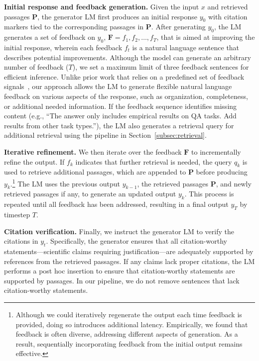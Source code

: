 \documentclass{article} %
\renewcommand{\paragraph}[1]{\noindent \textbf{#1}}
\begin{document}
\paragraph{Initial response and feedback generation.}
Given the input $x$ and retrieved passages $\mathbf{P}$, the generator LM first produces an initial response $y_0$  with citation markers tied to the corresponding passages in $\mathbf{P}$.
After generating $y_0$, the LM generates a set of feedback on $y_0$, $\mathbf{F} = {f_1, f_2, \ldots, f_T}$, that is aimed at improving the initial response, wherein each feedback $f_t$ is a natural language sentence that describes potential improvements. 
Although the model can generate an arbitrary number of feedback ($T$), we set a maximum limit of three feedback sentences for efficient inference. 
Unlike prior work that relies on a predefined set of feedback signals~\citep{asai2024selfrag}, our approach allows the LM to generate flexible natural language feedback on various aspects of the response, such as organization, completeness, or additional needed information. If the feedback sequence identifies missing content (e.g., ``The answer only includes empirical results on QA tasks. Add results from other task types.''), the LM also generates a retrieval query for additional retrieval using the pipeline in Section~\ref{subsec:retrieval}. 

\paragraph{Iterative refinement.} 
We then iterate over the feedback $\mathbf{F}$ to incrementally refine the output. 
If $f_k$ indicates that further retrieval is needed, the query $q_k$ is used to retrieve additional passages, which are appended to $\mathbf{P}$ before producing $y_k$.\footnote{Although we could iteratively regenerate the output each time feedback is provided, doing so introduces additional latency. Empirically, we found that feedback is often diverse, addressing different aspects of generation. As a result, sequentially incorporating feedback from the initial output remains effective.} 
The LM uses the previous output $y_{k-1}$, the retrieved passages $\mathbf{P}$, and newly retrieved passages if any, to generate an updated output $y_k$. 
This process is repeated until all feedback has been addressed, resulting in a final output $y_T$ by timestep $T$. 


\paragraph{Citation verification. }
Finally, we instruct the generator LM to verify the citations in $y_t$. 
Specifically, the generator ensures that all citation-worthy statements—scientific claims requiring justification—are adequately supported by references from the retrieved passages. 
If any claims lack proper citations, the LM performs a post hoc insertion to ensure that citation-worthy statements are supported by passages. In our pipeline, we do not remove sentences that lack citation-worthy statements. 
\end{document}
